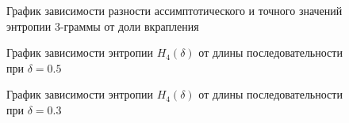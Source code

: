 ﻿\documentclass[a4paper,12pt]{article}
\theoremstyle{plain}
\begin{document}
			\begin{figure}[h]
				\caption{График зависимости разности ассимптотического и точного значений энтропии 3-граммы от доли вкрапления}
				\label{ris:"h3.png"}
			\end{figure}
			\begin{figure}[h]
				\caption{График зависимости энтропии $H_4{(\delta)}$ от длины последовательности при  $\delta = 0.5$}
				\label{ris:"h4_05.png"}
			\end{figure}
				\begin{figure}[h]
					\caption{График зависимости энтропии $H_4{(\delta)}$ от длины последовательности при  $\delta = 0.3$}
					\label{ris:"h4_03.png"}
				\end{figure}
\end{document}
